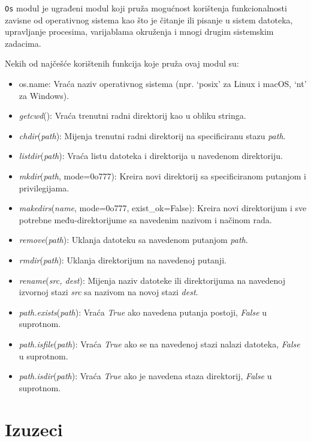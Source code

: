 \texttt{Os} modul je ugrađeni  modul koji pruža mogućnost korištenja funkcionalnosti zavisne od operativnog sistema kao što je čitanje ili pisanje u sistem datoteka, upravljanje procesima, varijablama okruženja i mnogi drugim sistemskim zadacima.

Nekih od najčešće korištenih funkcija koje pruža ovaj modul su:

\begin{itemize}
	\item os.name: Vraća naziv operativnog sistema (npr. `posix' za Linux i macOS, `nt' za Windows).
	\item  \textit{getcwd}(): Vraća trenutni radni direktorij kao u obliku stringa.
	\item  \textit{chdir}(\emph{path}): Mijenja trenutni radni direktorij na specificiranu stazu \emph{path}.
	\item \textit{listdir}(\emph{path}): Vraća listu datoteka i direktorija u navedenom direktoriju.
	\item \textit{mkdir}(\emph{path}, mode=0o777): Kreira novi direktorij sa specificiranom putanjom i privilegijama.
	\item \textit{makedirs}(\textit{name}, mode=0o777, exist\_ok=False): Kreira novi direktorijum i sve potrebne među-direktorijume sa navedenim nazivom i načinom rada.
	\item \textit{remove}(\emph{path}): Uklanja datoteku sa navedenom putanjom \emph{path}.
	\item \textit{rmdir}(\emph{path}): Uklanja direktorijum na navedenoj putanji.
	\item \textit{rename}(\emph{src, dest}): Mijenja naziv datoteke ili direktorijuma na navedenoj izvornoj stazi \emph{src} sa nazivom na novoj stazi \emph{dest}.
	\item \textit{path.exists}(\emph{path}): Vraća \emph{True} ako navedena putanja postoji, \emph{False} u suprotnom.
	\item \textit{path.isfile}(\emph{path}): Vraća \emph{True} ako se na navedenoj stazi nalazi datoteka, \emph{False} u suprotnom.
	\item \textit{path.isdir}(\emph{path}): Vraća \emph{True} ako je navedena staza direktorij, \emph{False} u suprotnom.
  
\end{itemize}

\section{Izuzeci}

